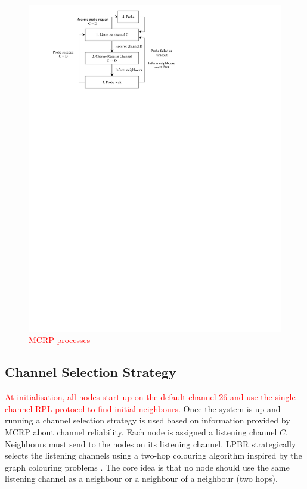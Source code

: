 \begin{figure}
\centering
\includegraphics[trim=2cm 20.5cm 9cm 0cm, clip=true, totalheight=0.2\textheight]{figures/MCRPprocesses.pdf}
\caption{\textcolor{red}{MCRP processes}}
\label{fig_mcrp}
\end{figure}

\subsection{Channel Selection Strategy}
\textcolor{red}{At initialisation, all nodes start up on the default channel 26 and use the single channel RPL protocol to find initial neighbours.}
Once the system is up and running a channel selection strategy is used based on information provided by MCRP about channel reliability. Each node is assigned a listening channel $C$. Neighbours must send to the nodes on its listening channel.  
LPBR strategically selects the listening channels using a two-hop colouring algorithm inspired by the graph colouring problems \cite{graphColouring}. The core idea is that no node should use the same listening channel as a neighbour or a neighbour of a neighbour (two hops).

